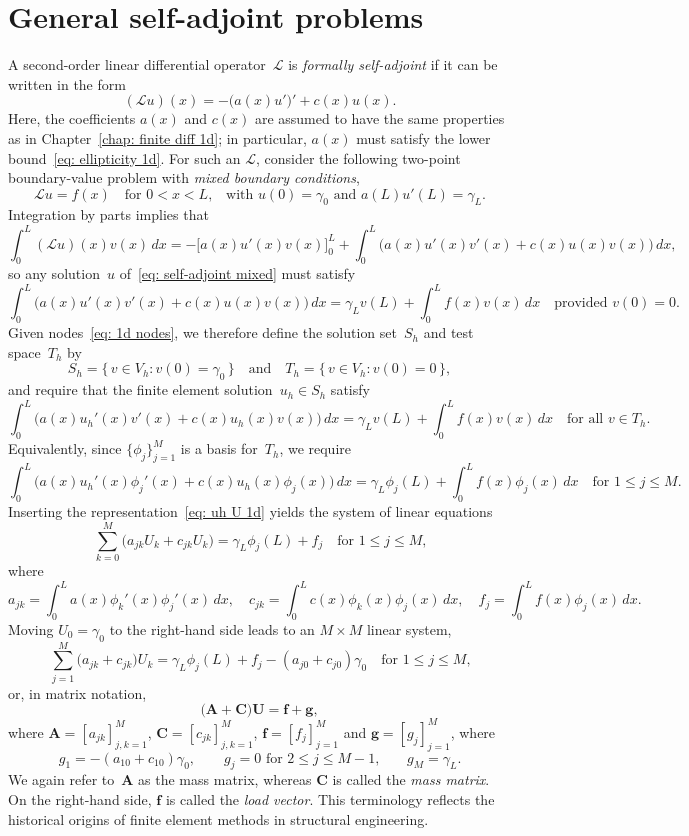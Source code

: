 \section{General self-adjoint problems}
A second-order linear differential operator~$\mathcal{L}$ is 
\emph{formally self-adjoint} if it can be written in the form
\[
(\mathcal{L}u)(x)=-\bigl(a(x)u'\bigr)'+c(x)u(x).
\]
Here, the coefficients $a(x)$ and $c(x)$ are assumed to have the same 
properties as in Chapter~\ref{chap: finite diff 1d}; in particular, $a(x)$ must 
satisfy the lower bound~\eqref{eq: ellipticity 1d}. For such an $\mathcal{L}$, 
consider the following two-point boundary-value problem with \emph{mixed 
boundary conditions},
\begin{equation}\label{eq: self-adjoint mixed}
\mathcal{L}u=f(x)\quad\text{for $0<x<L$,}\quad
\text{with $u(0)=\gamma_0$ and $a(L)u'(L)=\gamma_L$.}
\end{equation}
Integration by parts implies that
\[
\int_0^L(\mathcal{L}u)(x)v(x)\,dx
    =-\bigl[a(x)u'(x)v(x)\bigr]_0^L+\int_0^L\bigl(a(x)u'(x)v'(x)+c(x)u(x)v(x)
        \bigr)\,dx,
\]
so any solution~$u$ of~\eqref{eq: self-adjoint mixed} must satisfy
\[
\int_0^L\bigl(a(x)u'(x)v'(x)+c(x)u(x)v(x)\bigr)\,dx
    =\gamma_Lv(L)+\int_0^Lf(x)v(x)\,dx
    \quad\text{provided $v(0)=0$.}
\]
Given nodes~\eqref{eq: 1d nodes}, we therefore define the solution set~$S_h$ and 
test space~$T_h$ by
\[
S_h=\{\,v\in V_h:v(0)=\gamma_0\,\}
\quad\text{and}\quad
T_h=\{\,v\in V_h:v(0)=0\,\},
\]
and require that the finite element solution~$u_h\in S_h$ satisfy
\[
\int_0^L\bigl(a(x)u_h'(x)v'(x)+c(x)u_h(x)v(x)\bigr)\,dx
    =\gamma_Lv(L)+\int_0^Lf(x)v(x)\,dx
    \quad\text{for all $v\in T_h$.}
\]
Equivalently, since $\{\phi_j\}_{j=1}^M$ is a basis for~$T_h$, we require
\[
\int_0^L\bigl(a(x)u_h'(x)\phi_j'(x)+c(x)u_h(x)\phi_j(x)\bigr)\,dx
    =\gamma_L\phi_j(L)+\int_0^Lf(x)\phi_j(x)\,dx
    \quad\text{for $1\le j\le M$.}
\]
Inserting the representation~\eqref{eq: uh U 1d} yields the system of linear 
equations
\[
\sum_{k=0}^M\bigl(a_{jk}U_k+c_{jk}U_k\bigr)=\gamma_L\phi_j(L)+f_j
    \quad\text{for $1\le j\le M$,}
\]
where
\[
a_{jk}=\int_0^La(x)\phi_k'(x)\phi_j'(x)\,dx,\quad
c_{jk}=\int_0^Lc(x)\phi_k(x)\phi_j(x)\,dx,\quad
f_j=\int_0^Lf(x)\phi_j(x)\,dx.
\]
Moving $U_0=\gamma_0$ to the right-hand side leads to an $M\times M$ linear 
system,
\[
\sum_{j=1}^M\bigl(a_{jk}+c_{jk})U_k
    =\gamma_L\phi_j(L)+f_j-(a_{j0}+c_{j0})\gamma_0
    \quad\text{for $1\le j\le M$,}
\]
or, in matrix notation,
\[
\bigl(\boldsymbol{A}+\boldsymbol{C}\bigr)\boldsymbol{U}
    =\boldsymbol{f}+\boldsymbol{g},
\]
where $\boldsymbol{A}=[a_{jk}]_{j,k=1}^M$, $\boldsymbol{C}=[c_{jk}]_{j,k=1}^M$,
$\boldsymbol{f}=[f_j]_{j=1}^M$ and $\boldsymbol{g}=[g_j]_{j=1}^M$, where
\[
g_1=-(a_{10}+c_{10})\gamma_0,\qquad
\text{$g_j=0$ for $2\le j\le M-1$,}\qquad
g_M=\gamma_L.
\]
We again refer to~$\boldsymbol{A}$ as the mass matrix, whereas $\boldsymbol{C}$ 
is called the \emph{mass matrix}.  On the right-hand side, $\boldsymbol{f}$ is 
called the \emph{load vector}.  This terminology reflects the historical 
origins of finite element methods in structural engineering.

